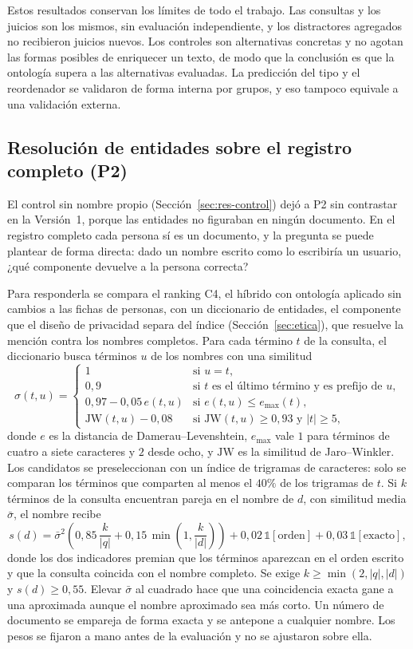 \documentclass[11pt,letterpaper]{article}
\numberwithin{equation}{section}
\begin{document}
Estos resultados conservan los límites de todo el trabajo. Las consultas y los juicios son los mismos, sin evaluación independiente, y los distractores agregados no recibieron juicios nuevos. Los controles son alternativas concretas y no agotan las formas posibles de enriquecer un texto, de modo que la conclusión es que la ontología supera a las alternativas evaluadas. La predicción del tipo y el reordenador se validaron de forma interna por grupos, y eso tampoco equivale a una validación externa.

\subsection{Resolución de entidades sobre el registro completo (P2)}
\label{sec:res-persona}
El control sin nombre propio (Sección~\ref{sec:res-control}) dejó a P2 sin contrastar en la Versión~1, porque las entidades no figuraban en ningún documento. En el registro completo cada persona sí es un documento, y la pregunta se puede plantear de forma directa: dado un nombre escrito como lo escribiría un usuario, ¿qué componente devuelve a la persona correcta?

Para responderla se compara el ranking C4, el híbrido con ontología aplicado sin cambios a las fichas de personas, con un diccionario de entidades, el componente que el diseño de privacidad separa del índice (Sección~\ref{sec:etica}), que resuelve la mención contra los nombres completos. Para cada término $t$ de la consulta, el diccionario busca términos $u$ de los nombres con una similitud
\[
\sigma(t,u)=\begin{cases}
1 & \text{si } u=t,\\
0{,}9 & \text{si } t \text{ es el último término y es prefijo de } u,\\
0{,}97-0{,}05\,e(t,u) & \text{si } e(t,u)\le e_{\max}(t),\\
\mathrm{JW}(t,u)-0{,}08 & \text{si } \mathrm{JW}(t,u)\ge 0{,}93 \text{ y } |t|\ge 5,
\end{cases}
\]
donde $e$ es la distancia de Damerau--Levenshtein, $e_{\max}$ vale $1$ para términos de cuatro a siete caracteres y $2$ desde ocho, y $\mathrm{JW}$ es la similitud de Jaro--Winkler. Los candidatos se preseleccionan con un índice de trigramas de caracteres: solo se comparan los términos que comparten al menos el $40\%$ de los trigramas de $t$. Si $k$ términos de la consulta encuentran pareja en el nombre de $d$, con similitud media $\bar\sigma$, el nombre recibe
\[
s(d)=\bar\sigma^{2}\left(0{,}85\,\frac{k}{|q|}+0{,}15\,\min\!\left(1,\frac{k}{|d|}\right)\right)+0{,}02\,\mathbb{1}[\text{orden}]+0{,}03\,\mathbb{1}[\text{exacto}],
\]
donde los dos indicadores premian que los términos aparezcan en el orden escrito y que la consulta coincida con el nombre completo. Se exige $k\ge\min(2,|q|,|d|)$ y $s(d)\ge0{,}55$. Elevar $\bar\sigma$ al cuadrado hace que una coincidencia exacta gane a una aproximada aunque el nombre aproximado sea más corto. Un número de documento se empareja de forma exacta y se antepone a cualquier nombre. Los pesos se fijaron a mano antes de la evaluación y no se ajustaron sobre ella.
\end{document}
